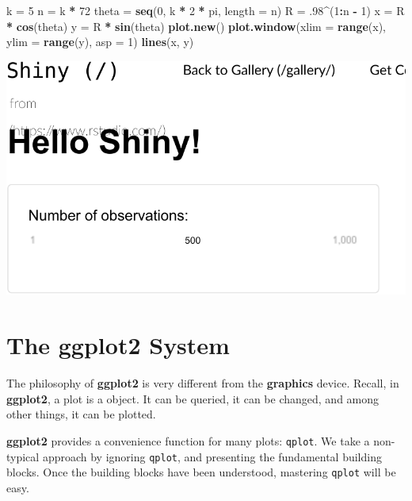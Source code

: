 \documentclass[]{book}
\newenvironment{Shaded}{\begin{snugshade}}{\end{snugshade}}
\newcommand{\KeywordTok}[1]{\textcolor[rgb]{0.13,0.29,0.53}{\textbf{#1}}}
\newcommand{\DataTypeTok}[1]{\textcolor[rgb]{0.13,0.29,0.53}{#1}}
\newcommand{\DecValTok}[1]{\textcolor[rgb]{0.00,0.00,0.81}{#1}}
\newcommand{\StringTok}[1]{\textcolor[rgb]{0.31,0.60,0.02}{#1}}
\newcommand{\OperatorTok}[1]{\textcolor[rgb]{0.81,0.36,0.00}{\textbf{#1}}}
\newcommand{\NormalTok}[1]{#1}
\theoremstyle{definition}
\theoremstyle{definition}
\theoremstyle{definition}
\theoremstyle{remark}
\begin{document}
\begin{Shaded}
\begin{Highlighting}[]
\NormalTok{k =}\StringTok{ }\DecValTok{5}
\NormalTok{n =}\StringTok{ }\NormalTok{k }\OperatorTok{*}\StringTok{ }\DecValTok{72}
\NormalTok{theta =}\StringTok{ }\KeywordTok{seq}\NormalTok{(}\DecValTok{0}\NormalTok{, k }\OperatorTok{*}\StringTok{ }\DecValTok{2} \OperatorTok{*}\StringTok{ }\NormalTok{pi, }\DataTypeTok{length =}\NormalTok{ n)}
\NormalTok{R =}\StringTok{ }\NormalTok{.}\DecValTok{98}\OperatorTok{^}\NormalTok{(}\DecValTok{1}\OperatorTok{:}\NormalTok{n }\OperatorTok{-}\StringTok{ }\DecValTok{1}\NormalTok{)}
\NormalTok{x =}\StringTok{ }\NormalTok{R }\OperatorTok{*}\StringTok{ }\KeywordTok{cos}\NormalTok{(theta)}
\NormalTok{y =}\StringTok{ }\NormalTok{R }\OperatorTok{*}\StringTok{ }\KeywordTok{sin}\NormalTok{(theta)}
\KeywordTok{plot.new}\NormalTok{()}
\KeywordTok{plot.window}\NormalTok{(}\DataTypeTok{xlim =} \KeywordTok{range}\NormalTok{(x), }\DataTypeTok{ylim =} \KeywordTok{range}\NormalTok{(y), }\DataTypeTok{asp =} \DecValTok{1}\NormalTok{)}
\KeywordTok{lines}\NormalTok{(x, y)}
\end{Highlighting}
\end{Shaded}

\includegraphics[width=0.5\linewidth]{Rcourse_files/figure-latex/unnamed-chunk-263-1}

\section{The ggplot2 System}\label{the-ggplot2-system}

The philosophy of \textbf{ggplot2} is very different from the
\textbf{graphics} device. Recall, in \textbf{ggplot2}, a plot is a
object. It can be queried, it can be changed, and among other things, it
can be plotted.

\textbf{ggplot2} provides a convenience function for many plots:
\texttt{qplot}. We take a non-typical approach by ignoring
\texttt{qplot}, and presenting the fundamental building blocks. Once the
building blocks have been understood, mastering \texttt{qplot} will be
easy.
\end{document}

